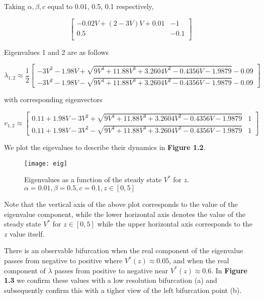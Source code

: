 \documentclass[11pt]{report}
\begin{document}
Taking $\alpha,\beta,c$ equal to 0.01, 0.5, 0.1 respectively,

$$
\begin{bmatrix}
    −0.02V + (2 - 3V)V+0.01 & -1 \\
    0.5 & -0.1 \\    
\end{bmatrix}
$$

Eigenvalues 1 and 2 are as follows

$$ \lambda_{1,2} \approx \frac{1}{2}\begin{bmatrix}-3V^2 - 1.98V + \sqrt{ 9V^4 + 11.88 V^3 + 3.2604 V^2 - 0.4356 V - 1.9879 } - 0.09 \\ -3V^2 - 1.98V - \sqrt{ 9V^4 + 11.88 V^3 + 3.2604 V^2 - 0.4356 V - 1.9879 } - 0.09 \end{bmatrix} $$

with corresponding eigenvectors

$$ v_{1,2} \approx \begin{bmatrix} 0.11 + 1.98V - 3V^2 + \sqrt{ 9V^4 + 11.88 V^3 + 3.2604 V^2 - 0.4356 V - 1.9879} & 1 \\ 0.11 + 1.98V - 3V^2 - \sqrt{ 9V^4 + 11.88 V^3 + 3.2604 V^2 - 0.4356 V - 1.9879} & 1 \end{bmatrix} $$

We plot the eigevalues to describe their dynamics in \textbf{Figure 1.2}. 

\begin{figure}[!ht]
  \caption{Eigenvalues as a function of the steady state $V^*$ for $z$.  $\alpha = 0.01, \beta = 0.5,c = 0.1,z \in [0,5]$ }
  \centering
    \texttt{[image: eig]}
\end{figure}

Note that the vertical axis of the above plot corresponds to the value of the eigenvalue component, while the lower horizontal axis denotes the value of the steady state $V^*$ for $z \in [0,5]$ while the upper horizontal axis corresponds to the $z$ value itself.

There is an observable bifurcation when the real component of the eigenvalue passes from negative to positive where $V^*(z) \approx 0.05$, and when the real component of $\lambda$ passes from positive to negative near $V^*(z) \approx 0.6$. In \textbf{Figure 1.3} we confirm these values with a low resolution bifurcation (a) and subsequently confirm this with a tigher view of the left bifurcation point (b).
\end{document}
